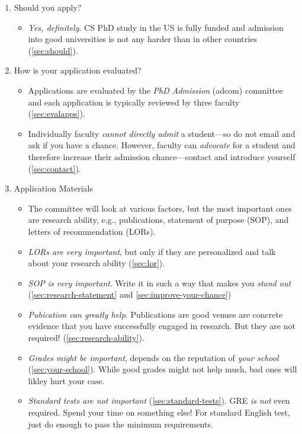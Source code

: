 \documentclass[oneside,11pt,dvipsnames]{book}
\begin{document}
\begin{enumerate}
  \item Should you apply?
        \begin{itemize}
          \item \emph{Yes, definitely}.  CS PhD study in the US is fully funded and admission into good universities is not any harder than in other countries (\autoref{sec:should}).
        \end{itemize}
  \item How is your application evaluated?
        \begin{itemize}
          \item Applications are evaluated by the \emph{PhD Admission} (adcom) committee and each application is typically reviewed by three faculty (\autoref{sec:evalapps}).
          \item Individually faculty \emph{cannot directly admit} a student---so do not email and ask if you have a chance. However, faculty can \emph{advocate} for a student and therefore increase their admission chance---contact and introduce yourself (\autoref{sec:contact}).
         \end{itemize}
  \item Application Materials
        \begin{itemize}
          \item The committee will look at various factors, but the most important ones are research ability, e.g., publications, statement of purpose (SOP), and  letters of recommendation (LORs).
          \item \emph{LORs are very important}, but only if they are personalized and talk about your research ability (\autoref{sec:lor}).
          \item \emph{SOP is very important}. Write it in such a way that makes you \emph{stand out} (\autoref{sec:research-statement} and \autoref{sec:improve-your-chance})
          \item  \emph{Pubication can greatly help}. Publications are good venues are concrete evidence that you have successfully engaged in research. But they are not required! (\autoref{sec:research-ability}).

          \item \emph{Grades might be important}, depends on the reputation of \emph{your school} (\autoref{sec:your-school}). While good grades might not help much, bad ones will likley hurt your case.
          \item \emph{Standard tests are not important} (\autoref{sec:standard-tests}). GRE \emph{is not} even required. Spend your time on something else! For standard English test, just do enough to pass the minimum requirements.


\end{itemize}
\end{enumerate}
\end{document}
